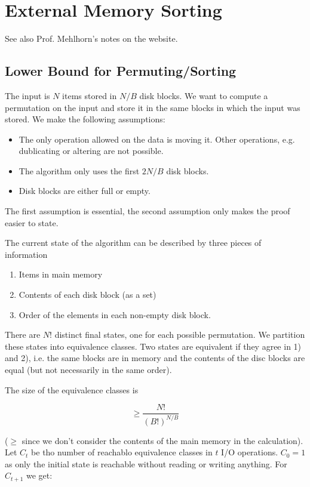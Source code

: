 \section{External Memory Sorting}

See also Prof. Mehlhorn's notes on the website.

\subsection{Lower Bound for Permuting/Sorting}

The input is $N$ items stored in $N/B$ disk blocks. We want to compute a permutation on the input and store it in the same blocks in which the input was stored. We make the following assumptions:

\begin{itemize}
\item The only operation allowed on the data is moving it. Other operations, e.g. dublicating or altering are not possible.
\item The algorithm only uses the first $2N/B$ disk blocks.
\item Disk blocks are either full or empty.
\end{itemize}

The first assumption is essential, the second assumption only makes the proof easier to state.

The current state of the algorithm can be described by three pieces of information

\begin{enumerate}
\item Items in main memory
\item Contents of each disk block (as a set)
\item Order of the elements in each non-empty disk block.
\end{enumerate}

There are $N!$ distinct final states, one for each possible permutation. We partition these states into equivalence classes. Two states are equivalent if they agree in 1) and 2), i.e. the same blocks are in memory and the contents of the disc blocks are equal (but not necessarily in the same order).

The size of the equivalence classes is

\[\geq \frac{N!}{(B!)^{N/B}}\]

($\geq$ since we don't consider the contents of the main memory in the calculation). Let $C_t$ be tho number of reachablo equivalence classes in $t$ I/O operations. $C_0=1$ as only the initial state is reachable without reading or writing anything. For $C_{t+1}$ we get:

